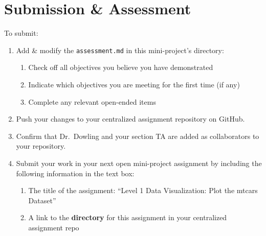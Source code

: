 \documentclass[
  man,
  floatsintext,
  longtable,
  nolmodern,
  notxfonts,
  notimes,
  colorlinks=true,linkcolor=blue,citecolor=blue,urlcolor=blue]{apa7}
\providecommand{\tightlist}{%
  \setlength{\itemsep}{0pt}\setlength{\parskip}{0pt}}
\begin{document}
\section{Submission \& Assessment}\label{submission-assessment}

To submit:

\begin{enumerate}
\def\labelenumi{\arabic{enumi}.}
\tightlist
\item
  Add \& modify the \texttt{assessment.md} in this mini-project's
  directory:

  \begin{enumerate}
  \def\labelenumii{\arabic{enumii}.}
  \tightlist
  \item
    Check off all objectives you believe you have demonstrated
  \item
    Indicate which objectives you are meeting for the first time (if
    any)
  \item
    Complete any relevant open-ended items
  \end{enumerate}
\item
  Push your changes to your centralized assignment repository on GitHub.
\item
  Confirm that Dr.~Dowling and your section TA are added as
  collaborators to your repository.
\item
  Submit your work in your next open mini-project assignment by
  including the following information in the text box:

  \begin{enumerate}
  \def\labelenumii{\arabic{enumii}.}
  \tightlist
  \item
    The title of the assignment: ``Level 1 Data Visualization: Plot the
    mtcars Dataset''
  \item
    A link to the \textbf{directory} for this assignment in your
    centralized assignment repo
  \end{enumerate}
\end{enumerate}
\end{document}
